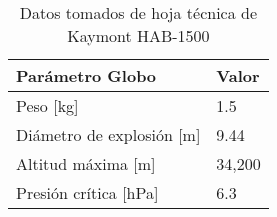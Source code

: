 \begin{table}[h]
\centering
\begin{tabular}{ll}
\toprule
        \textbf{Parámetro Globo}                    & \textbf{Valor}  \\
\midrule
        Peso [kg]                  & 1.5    \\
        Diámetro de explosión [m]  & 9.44   \\
        Altitud máxima [m]   & 34,200 \\
        Presión crítica [hPa] & 6.3    \\
\bottomrule
\end{tabular}
\caption{Datos tomados de hoja técnica de Kaymont HAB-1500}
\label{tab:globo_datos}
\end{table}



